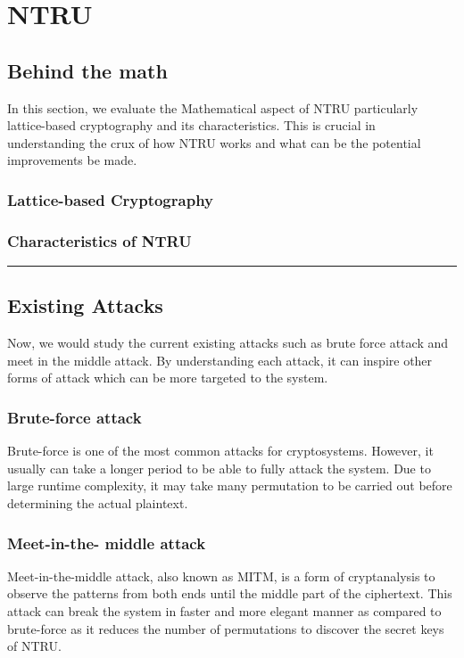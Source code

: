 \chapter{NTRU}
\section{Behind the math}
In this section, we evaluate the Mathematical aspect of NTRU particularly lattice-based cryptography and its characteristics.
This is crucial in understanding the crux of how NTRU works and what can be the potential improvements be made.

\subsection{Lattice-based Cryptography}

\subsection{Characteristics of NTRU}

\par\noindent\rule{\textwidth}{0.4pt}

\section{Existing Attacks}
Now, we would study the current existing attacks such as brute force attack and meet in the middle attack. 
By understanding each attack, it can inspire other forms of attack which can be more targeted to the system.

\subsection{Brute-force attack}
Brute-force is one of the most common attacks for cryptosystems. 
However, it usually can take a longer period to be able to fully attack the system.
Due to large runtime complexity, it may take many permutation to be carried out before determining the actual plaintext.

\subsection{Meet-in-the- middle attack}
Meet-in-the-middle attack, also known as MITM, is a form of cryptanalysis to observe the patterns from both ends until the middle part of the ciphertext.
This attack can break the system in faster and more elegant manner as compared to brute-force as it reduces the number of permutations to discover the secret keys of NTRU.

